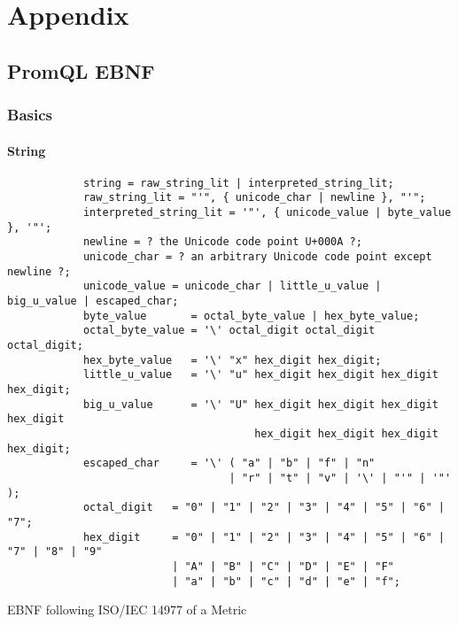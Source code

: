 \chapter{Appendix}
\section{PromQL EBNF}
\subsection{Basics}
\subsubsection{String}
\begin{listing}[H]
	\begin{samepage}
		\begin{verbatim}
			string = raw_string_lit | interpreted_string_lit;
			raw_string_lit = "'", { unicode_char | newline }, "'";
			interpreted_string_lit = '"', { unicode_value | byte_value }, '"';
			newline = ? the Unicode code point U+000A ?;
			unicode_char = ? an arbitrary Unicode code point except newline ?;
			unicode_value = unicode_char | little_u_value | big_u_value | escaped_char;
			byte_value       = octal_byte_value | hex_byte_value;
			octal_byte_value = '\' octal_digit octal_digit octal_digit;
			hex_byte_value   = '\' "x" hex_digit hex_digit;
			little_u_value   = '\' "u" hex_digit hex_digit hex_digit hex_digit;
			big_u_value      = '\' "U" hex_digit hex_digit hex_digit hex_digit
			                           hex_digit hex_digit hex_digit hex_digit;
			escaped_char     = '\' ( "a" | "b" | "f" | "n" 
			                       | "r" | "t" | "v" | '\' | "'" | '"' );
			octal_digit   = "0" | "1" | "2" | "3" | "4" | "5" | "6" | "7";
			hex_digit     = "0" | "1" | "2" | "3" | "4" | "5" | "6" | "7" | "8" | "9"
					      | "A" | "B" | "C" | "D" | "E" | "F"
					      | "a" | "b" | "c" | "d" | "e" | "f";
		\end{verbatim}
		\caption{EBNF following ISO/IEC 14977 of a Metric}
	\end{samepage}
\end{listing}

